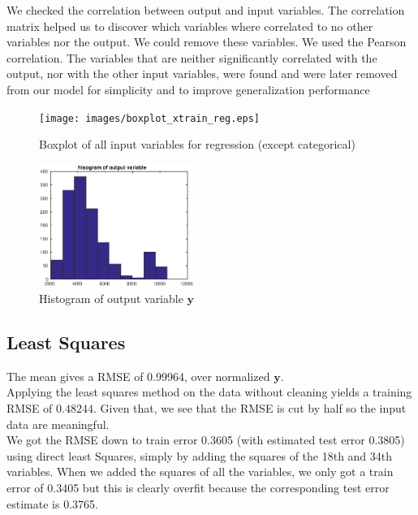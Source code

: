\documentclass{article} %
\begin{document}
We checked the correlation between output and input variables. The correlation matrix helped us to discover which variables where correlated to no other variables nor the output. We could remove these variables. We used the Pearson correlation. The variables that are neither significantly correlated with the output, nor with the other input variables, were found and were later removed from our model for simplicity and to improve generalization performance
\begin{figure}
\centering
\texttt{[image: images/boxplot\_xtrain\_reg.eps]}
\caption{Boxplot of all input variables for regression (except categorical)}
\label{fig:boxplot}
\end{figure}

\begin{figure}
\centering
\includegraphics[width=0.45\textwidth]{images/hist_output.eps}
\caption{Histogram of output variable $\mathbf{y}$}
\label{fig:outputhist}
\end{figure}

\subsection{Least Squares}

The mean gives a RMSE of 0.99964, over normalized $\mathbf{y}$.\\

Applying the least squares method on the data without cleaning yields a training RMSE of $0.48244$. Given that, we see that the RMSE is cut by half so the input data are meaningful.
\\

We got the RMSE down to train error 0.3605 (with estimated test error 0.3805) using direct least Squares, simply by adding the squares of the 18th and 34th variables. When we added the squares of all the variables, we only got a train error of 0.3405 but this is clearly overfit because the corresponding test error estimate is 0.3765.\\
\end{document}
